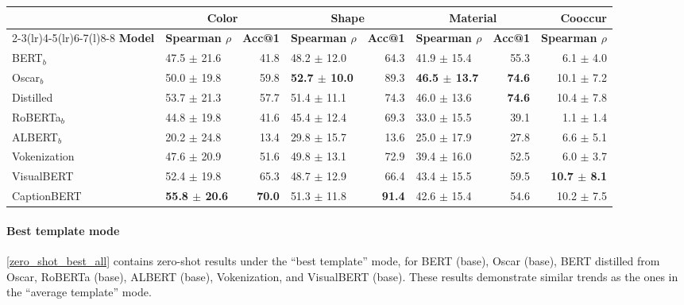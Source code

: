 \documentclass[11pt]{article}
\begin{document}
\begin{table*}[ht]
\small
\centering
\begin{tabular}{l|lr|lr|lr|r}
\hline
& \multicolumn{2}{c|}{\textbf{Color}} & \multicolumn{2}{c|}{\textbf{Shape}} & \multicolumn{2}{c|}{\textbf{Material}} & \textbf{Cooccur}\\
\cmidrule(lr){2-3}\cmidrule(lr){4-5}\cmidrule(lr){6-7}\cmidrule(l){8-8}
\textbf{Model} & \textbf{Spearman $\rho$} & \textbf{Acc@1} & \textbf{Spearman $\rho$} & \textbf{Acc@1} & \textbf{Spearman $\rho$} & \textbf{Acc@1} & \textbf{Spearman $\rho$}\\
\hline
BERT$_b$ & 47.5 $\pm$ 21.6 & 41.8 & 48.2 $\pm$ 12.0 & 64.3 & 41.9 $\pm$ 15.4 & 55.3 & 6.1 $\pm$ 4.0\\
Oscar$_b$ & 50.0 $\pm$ 19.8 & 59.8 & \textbf{52.7 $\pm$ 10.0} & 89.3 & \textbf{46.5 $\pm$ 13.7} & \textbf{74.6} & 10.1 $\pm$ 7.2\\
Distilled & 53.7 $\pm$ 21.3 & 57.7 & 51.4 $\pm$ 11.1 & 74.3 & 46.0 $\pm$ 13.6 & \textbf{74.6} & 10.4 $\pm$ 7.8\\
RoBERTa$_b$ & 44.8 $\pm$ 19.8 & 41.6 & 45.4 $\pm$ 12.4 & 69.3 & 33.0 $\pm$ 15.5 & 39.1 & 1.1 $\pm$ 1.4\\
ALBERT$_b$ & 20.2 $\pm$ 24.8 & 13.4 & 29.8 $\pm$ 15.7 & 13.6 & 25.0 $\pm$ 17.9 & 27.8 & 6.6 $\pm$ 5.1\\
Vokenization & 47.6 $\pm$ 20.9 & 51.6 & 49.8 $\pm$ 13.1 & 72.9 & 39.4 $\pm$ 16.0 & 52.5 & 6.0 $\pm$ 3.7\\
VisualBERT & 52.4 $\pm$ 19.8 & 65.3 & 48.7 $\pm$ 12.9 & 66.4 & 43.4 $\pm$ 15.5 & 59.5 & \textbf{10.7 $\pm$ 8.1}\\
CaptionBERT & \textbf{55.8 $\pm$ 20.6} & \textbf{70.0} & 51.3 $\pm$ 11.8 & \textbf{91.4} & 42.6 $\pm$ 15.4 & 54.6 & 10.2 $\pm$ 7.5\\
\hline
\end{tabular}
\caption{\label{zero_shot_best_all}
Spearman correlation and top-1 accuracy (both $\times$ 100) of zero shot probing. This is the ``best template'' case discussed in \cref{models}.}
\end{table*}

\paragraph{Best template mode}
\label{sec:zero-shot}
\cref{zero_shot_best_all} contains zero-shot results under the ``best template'' mode, for BERT (base), Oscar (base), BERT distilled from Oscar, RoBERTa (base), ALBERT (base), Vokenization, and VisualBERT (base). These results demonstrate similar trends as the ones in the ``average template'' mode.
\end{document}
